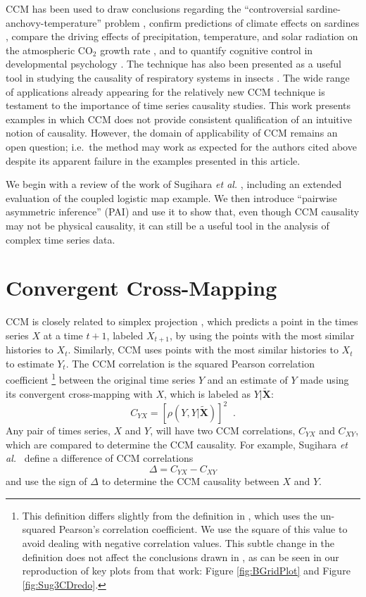 \documentclass[twocolumn,aps,pre,groupedaddress]{revtex4-1}
\begin{document}
CCM has been used to draw conclusions regarding the ``controversial sardine-anchovy-temperature'' problem \cite{Sugihara2012}, confirm predictions of climate effects on sardines \cite{Deyle2013}, compare the driving effects of precipitation, temperature, and solar radiation on the atmospheric CO$_2$ growth rate \cite{Wang2014}, and to quantify cognitive control in developmental psychology \cite{Anastas2013}.  The technique has also been presented as a useful tool in studying the causality of respiratory systems in insects \cite{Bozorgmagham2013}.  The wide range of applications already appearing for the relatively new CCM technique is testament to the importance of time series causality studies.  This work presents examples in which CCM does not provide consistent qualification of an intuitive notion of causality.  However, the domain of applicability of CCM remains an open question; i.e.\ the method may work as expected for the authors cited above despite its apparent failure in the examples presented in this article. 

We begin with a review of the work of Sugihara {\em et al.} \cite{Sugihara2012}, including an extended evaluation of the coupled logistic map example.  We then introduce ``pairwise asymmetric inference'' (PAI) and use it to show that, even though CCM causality may not be physical causality, it can still be a useful tool in the analysis of complex time series data.

\section{Convergent Cross-Mapping}
CCM is closely related to simplex projection \cite{Sugihara1990,Sugihara1990a}, which predicts a point in the times series $X$ at a time $t+1$, labeled $X_{t+1}$, by using the points with the most similar histories to $X_t$.  Similarly, CCM uses points with the most similar histories to $X_t$ to estimate $Y_t$.  The CCM correlation is the squared Pearson correlation coefficient \footnote{This definition differs slightly from the definition in \cite{Sugihara2012}, which uses the un-squared Pearson’s correlation coefficient.  We use the square of this value to avoid dealing with negative correlation values.  This subtle change in the definition does not affect the conclusions drawn in \cite{Sugihara2012}, as can be seen in our reproduction of key plots from that work: Figure \ref{fig:BGridPlot} and Figure \ref{fig:Sug3CDredo}.} between the original time series $Y$ and an estimate of $Y$ made using its convergent cross-mapping with $X$, which is labeled as $Y|\tilde{\mathbf{X}}$:
$$
C_{YX} = \left[\rho(Y,Y|\tilde{\mathbf{X}})\right]^2\;\;.
$$
Any pair of times series, $X$ and $Y$, will have two CCM correlations, $C_{YX}$ and $C_{XY}$, which are compared to determine the CCM causality.  For example, Sugihara {\em et al.\ }\cite{Sugihara2012} define a difference of CCM correlations
\begin{equation}
\label{eqn:delta}
\Delta = C_{YX} - C_{XY}
\end{equation}
and use the sign of $\Delta$ to determine the CCM causality between $X$ and $Y$.
\end{document}
